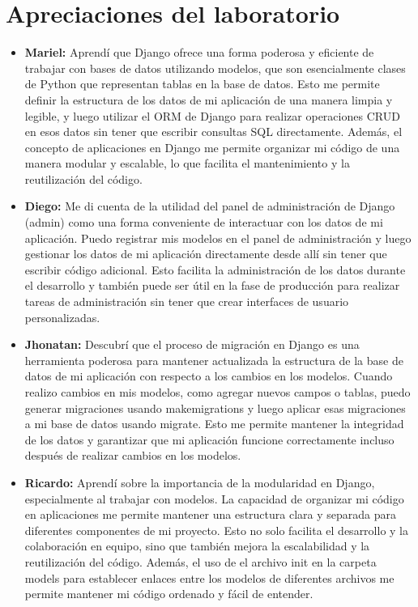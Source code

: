 \section{Apreciaciones del laboratorio}

\begin{itemize}
  \item \textbf{Mariel:} Aprendí que Django ofrece una forma poderosa y eficiente de trabajar con bases de datos utilizando modelos, que son esencialmente clases de Python que representan tablas en la base de datos. Esto me permite definir la estructura de los datos de mi aplicación de una manera limpia y legible, y luego utilizar el ORM de Django para realizar operaciones CRUD en esos datos sin tener que escribir consultas SQL directamente. Además, el concepto de aplicaciones en Django me permite organizar mi código de una manera modular y escalable, lo que facilita el mantenimiento y la reutilización del código.

  \item \textbf{Diego:} Me di cuenta de la utilidad del panel de administración de Django (admin) como una forma conveniente de interactuar con los datos de mi aplicación. Puedo registrar mis modelos en el panel de administración y luego gestionar los datos de mi aplicación directamente desde allí sin tener que escribir código adicional. Esto facilita la administración de los datos durante el desarrollo y también puede ser útil en la fase de producción para realizar tareas de administración sin tener que crear interfaces de usuario personalizadas.

  \item \textbf{Jhonatan:} Descubrí que el proceso de migración en Django es una herramienta poderosa para mantener actualizada la estructura de la base de datos de mi aplicación con respecto a los cambios en los modelos. Cuando realizo cambios en mis modelos, como agregar nuevos campos o tablas, puedo generar migraciones usando makemigrations y luego aplicar esas migraciones a mi base de datos usando migrate. Esto me permite mantener la integridad de los datos y garantizar que mi aplicación funcione correctamente incluso después de realizar cambios en los modelos.
  
  \item \textbf{Ricardo:} Aprendí sobre la importancia de la modularidad en Django, especialmente al trabajar con modelos. La capacidad de organizar mi código en aplicaciones me permite mantener una estructura clara y separada para diferentes componentes de mi proyecto. Esto no solo facilita el desarrollo y la colaboración en equipo, sino que también mejora la escalabilidad y la reutilización del código. Además, el uso de el archivo init en la carpeta models para establecer enlaces entre los modelos de diferentes archivos me permite mantener mi código ordenado y fácil de entender.

\end{itemize}